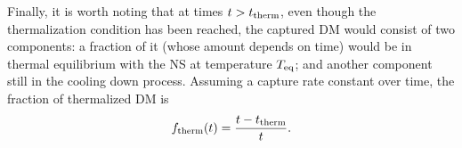 Finally, it is worth noting that at times  $t>t_{\rm therm}$, even though the thermalization condition has been reached, the captured DM would consist of two components: a fraction of it (whose amount depends on time) would be in thermal equilibrium with the NS at temperature $T_{\rm eq}$; and another component still in the cooling down process. Assuming a  capture rate constant over time, the fraction of thermalized DM is 
\begin{equation}
    f_{\rm therm}(t) = \frac{t-t_{\rm therm}}{t}.
\end{equation}
